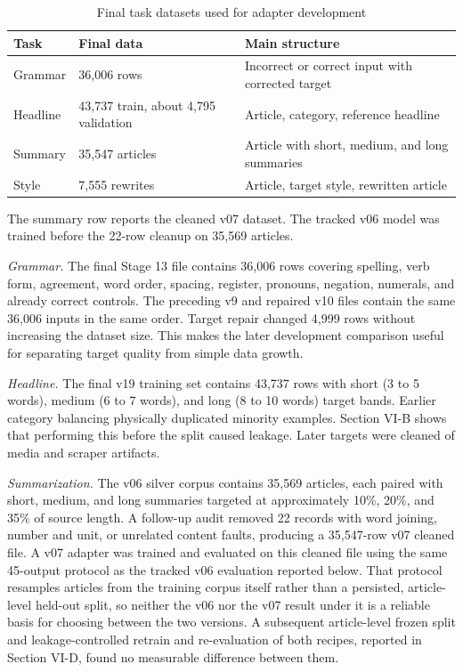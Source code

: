 \documentclass[a4paper,conference]{IEEEtran}
\begin{document}
\begin{table}[!b]
\caption{Final task datasets used for adapter development}
\label{tab:datasets}
\centering
\footnotesize
\setlength{\tabcolsep}{2.6pt}
\renewcommand{\arraystretch}{1.05}
\begin{tabular}{|p{}|p{}|p{}|}
\hline
\textbf{Task} & \textbf{Final data} & \textbf{Main structure} \\
\hline
Grammar & 36,006 rows & Incorrect or correct input with corrected target \\
\hline
Headline & 43,737 train, about 4,795 validation & Article, category, reference headline \\
\hline
Summary & 35,547 articles & Article with short, medium, and long summaries \\
\hline
Style & 7,555 rewrites & Article, target style, rewritten article \\
\hline
\end{tabular}
\end{table}

The summary row reports the cleaned v07 dataset. The tracked v06 model was
trained before the 22-row cleanup on 35,569 articles.

\textit{Grammar.} The final Stage 13 file contains 36,006 rows covering spelling,
verb form, agreement, word order, spacing, register, pronouns, negation,
numerals, and already correct controls. The preceding v9 and repaired v10
files contain the same 36,006 inputs in the same order. Target repair changed
4,999 rows without increasing the dataset size. This makes the later development
comparison useful for separating target quality from simple data growth.

\textit{Headline.} The final v19 training set contains 43,737 rows with short
(3 to 5 words), medium (6 to 7 words), and long (8 to 10 words) target bands. Earlier category
balancing physically duplicated minority examples. Section VI-B shows that
performing this before the split caused leakage. Later targets were cleaned of
media and scraper artifacts.

\textit{Summarization.} The v06 silver corpus contains 35,569 articles, each
paired with short, medium, and long summaries targeted at approximately 10\%,
20\%, and 35\% of source length. A follow-up audit removed 22 records with
word joining, number and unit, or unrelated content faults, producing a 35,547-row
v07 cleaned file. A v07 adapter was trained and evaluated on this cleaned file
using the same 45-output protocol as the tracked v06 evaluation reported
below. That protocol resamples articles from the training corpus itself
rather than a persisted, article-level held-out split, so neither the v06 nor
the v07 result under it is a reliable basis for choosing between the two
versions. A subsequent article-level frozen split and leakage-controlled
retrain and re-evaluation of both recipes, reported in Section VI-D, found no
measurable difference between them.
\end{document}
